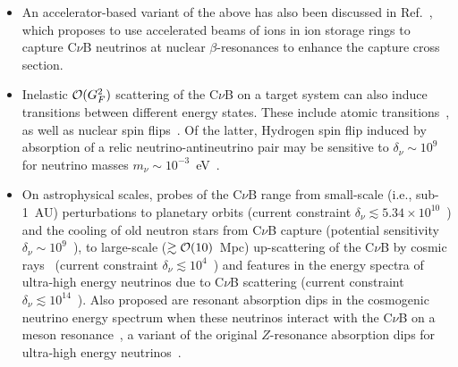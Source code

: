 \documentclass[aps,prd,10pt,twocolumn,superscriptaddress,floatfix,nofootinbib,amsmath,amssymb,altaffilletter,preprintnumbers]{revtex4-1}
\begin{document}
\begin{itemize}
\item An accelerator-based variant of the above has also been discussed in Ref.~\cite{Bauer:2021uyj}, which proposes to use accelerated beams of ions in ion storage rings to capture C$\nu$B neutrinos at nuclear $\beta$-resonances to enhance the capture cross section.  


\item Inelastic ${\cal O}(G_F^2)$ scattering of the C$\nu$B on a target system can also induce transitions between different energy states. These include atomic transitions~\cite{Yoshimura:2014hfa,Huang:2025yqu}, as well as nuclear spin flips~\cite{Bauer:2025hdq,Arvanitaki:2024taq}.  Of the latter, Hydrogen spin flip induced by absorption of a relic neutrino-antineutrino pair may be sensitive to $\delta_\nu \sim 10^{9}$ for neutrino masses $m_\nu \sim 10^{-3}$~eV~\cite{Bauer:2025hdq}.


\item On astrophysical scales, probes of the C$\nu$B range from small-scale (i.e., sub-1~AU) perturbations to planetary orbits (current constraint  $\delta_\nu \lesssim  5.34\times 10^{10}$~\cite{Aliberti:2024udm}) and the cooling of old neutron stars from C$\nu$B capture (potential sensitivity $\delta_\nu \sim 10^9$~\cite{Das:2024thc}), to large-scale  ($\gtrsim {\cal O}(10)$~Mpc) up-scattering of the C$\nu$B by cosmic rays~\cite{Ciscar-Monsalvatje:2024tvm, DeMarchi:2024zer,Herrera:2024upj} (current constraint $\delta_\nu \lesssim 10^{4}$~\cite{Herrera:2024upj}) and features in the energy spectra of ultra-high energy neutrinos due to C$\nu$B scattering (current constraint $\delta_\nu \lesssim 10^{14}$~\cite{Franklin:2024amy}).  Also proposed are resonant absorption dips in the
cosmogenic neutrino energy spectrum when these neutrinos interact with the C$\nu$B on a meson resonance~\cite{Brdar:2022kpu}, a variant of the original $Z$-resonance absorption dips for ultra-high energy neutrinos~\cite{Weiler:1982qy}.




\end{itemize} 
\end{document}
